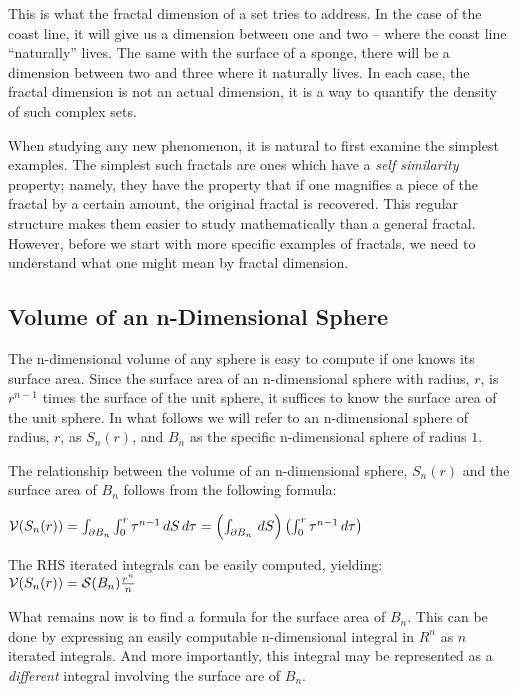 This is what the fractal dimension of a set tries to address. 
In the case of the coast line, it will give us a dimension between one and two
-- where the coast line ``naturally'' lives. The same with the surface of
a sponge,
there will be a dimension between two and three where it naturally lives. In
each case, the fractal dimension is not an actual dimension, 
it is a way to quantify the density of such complex sets.

When studying any new phenomenon, it is natural to first examine the
simplest examples. The simplest such fractals are ones which have a
{\it self similarity} property; namely, they have the property that if
one magnifies a piece of the fractal by a certain amount, the original
fractal is recovered. This regular structure makes them easier to
study mathematically than a general fractal. However, before we start
with more specific examples of fractals, we need to understand what 
one might mean by fractal dimension.

\subsection{Volume of an n-Dimensional Sphere}
The n-dimensional volume of any sphere is easy to compute if one 
knows its surface area. Since the surface area of an n-dimensional sphere 
with radius, $r$, is $r^{n-1}$ times the surface of the unit sphere, 
it suffices to know the surface area of the unit sphere.
In what follows we will refer to an n-dimensional sphere of radius, $r$, 
as $S_n(r)$, and $B_n$ as the specific n-dimensional sphere of radius $1$.

The relationship between the volume of an n-dimensional sphere, $S_n(r)$ and the 
surface area of $B_n$ follows from the following formula:%

${\cal V}(S_n(r)) =  \int_{\partial B_n} \int_0^r \tau^{n-1} \,dS \,d\tau = \left(\int_{\partial B_n} \, dS\right) \left( \int_0^r \tau^{n-1} \, d\tau \right)$

The RHS iterated integrals can be easily computed, yielding:
${\cal V}(S_n(r)) = {\cal S}(B_n) \frac{r^n}{n}$

What remains now is to find a formula for the surface area of $B_n.$
This can be done by expressing an easily computable 
n-dimensional integral in $R^n$ as $n$ iterated integrals. 
And more importantly, this integral may be represented as a {\it different\/} 
integral involving the surface are of $B_n$.

